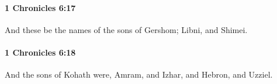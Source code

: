 		\paragraph{1 Chronicles 6:17} %
			\label{1CHRONICLES-6-17}

			And these be the names of the sons of Gershom; Libni, and Shimei.


		\paragraph{1 Chronicles 6:18} %
			\label{1CHRONICLES-6-18}

			And the sons of Kohath were, Amram, and Izhar, and Hebron, and Uzziel.


